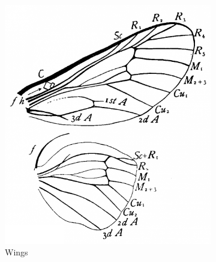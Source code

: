 \documentclass[letterpaper, 11pt]{article}
\begin{document}
\begin{figure}[ht!]
    \centering
    \begin{subfigure}[ht!]{0.36\textwidth}
        \includegraphics[width=\textwidth]{PsychidWings}
        \caption{Wings \citep[Fig. 46]{comstock1918wings}}
        \label{fig:psychid1}
    \end{subfigure}
    \hfill %
    \begin{subfigure}[ht!]{0.16\textwidth}

\end{subfigure}
\end{figure}
\end{document}
